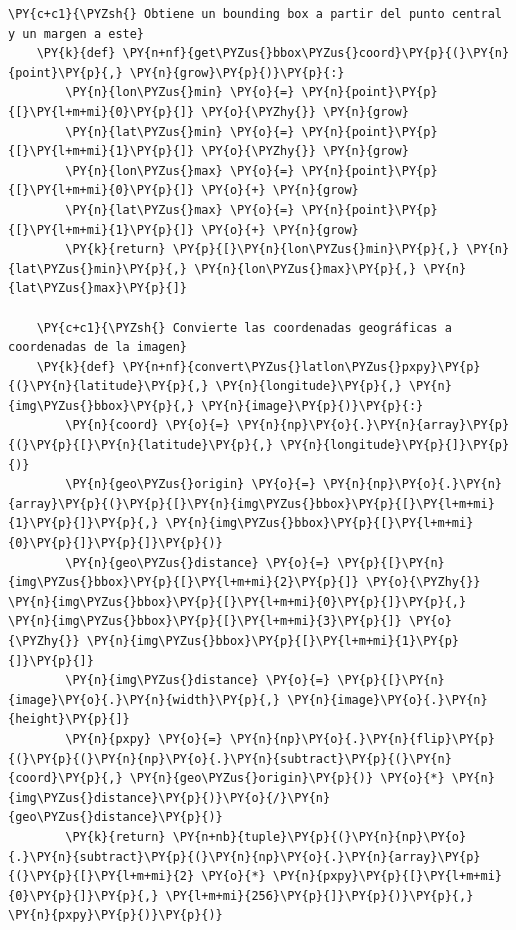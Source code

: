 \begin{tcolorbox}[breakable, size=fbox, boxrule=1pt, pad at break*=1mm,colback=cellbackground, colframe=cellborder, fontupper=\footnotesize]
    \begin{Verbatim}[commandchars=\\\{\}]
    \PY{c+c1}{\PYZsh{} Obtiene un bounding box a partir del punto central y un margen a este}
    \PY{k}{def} \PY{n+nf}{get\PYZus{}bbox\PYZus{}coord}\PY{p}{(}\PY{n}{point}\PY{p}{,} \PY{n}{grow}\PY{p}{)}\PY{p}{:}
        \PY{n}{lon\PYZus{}min} \PY{o}{=} \PY{n}{point}\PY{p}{[}\PY{l+m+mi}{0}\PY{p}{]} \PY{o}{\PYZhy{}} \PY{n}{grow}
        \PY{n}{lat\PYZus{}min} \PY{o}{=} \PY{n}{point}\PY{p}{[}\PY{l+m+mi}{1}\PY{p}{]} \PY{o}{\PYZhy{}} \PY{n}{grow}
        \PY{n}{lon\PYZus{}max} \PY{o}{=} \PY{n}{point}\PY{p}{[}\PY{l+m+mi}{0}\PY{p}{]} \PY{o}{+} \PY{n}{grow}
        \PY{n}{lat\PYZus{}max} \PY{o}{=} \PY{n}{point}\PY{p}{[}\PY{l+m+mi}{1}\PY{p}{]} \PY{o}{+} \PY{n}{grow}
        \PY{k}{return} \PY{p}{[}\PY{n}{lon\PYZus{}min}\PY{p}{,} \PY{n}{lat\PYZus{}min}\PY{p}{,} \PY{n}{lon\PYZus{}max}\PY{p}{,} \PY{n}{lat\PYZus{}max}\PY{p}{]}
    
    \PY{c+c1}{\PYZsh{} Convierte las coordenadas geográficas a coordenadas de la imagen}
    \PY{k}{def} \PY{n+nf}{convert\PYZus{}latlon\PYZus{}pxpy}\PY{p}{(}\PY{n}{latitude}\PY{p}{,} \PY{n}{longitude}\PY{p}{,} \PY{n}{img\PYZus{}bbox}\PY{p}{,} \PY{n}{image}\PY{p}{)}\PY{p}{:}       
        \PY{n}{coord} \PY{o}{=} \PY{n}{np}\PY{o}{.}\PY{n}{array}\PY{p}{(}\PY{p}{[}\PY{n}{latitude}\PY{p}{,} \PY{n}{longitude}\PY{p}{]}\PY{p}{)}   
        \PY{n}{geo\PYZus{}origin} \PY{o}{=} \PY{n}{np}\PY{o}{.}\PY{n}{array}\PY{p}{(}\PY{p}{[}\PY{n}{img\PYZus{}bbox}\PY{p}{[}\PY{l+m+mi}{1}\PY{p}{]}\PY{p}{,} \PY{n}{img\PYZus{}bbox}\PY{p}{[}\PY{l+m+mi}{0}\PY{p}{]}\PY{p}{]}\PY{p}{)}    
        \PY{n}{geo\PYZus{}distance} \PY{o}{=} \PY{p}{[}\PY{n}{img\PYZus{}bbox}\PY{p}{[}\PY{l+m+mi}{2}\PY{p}{]} \PY{o}{\PYZhy{}} \PY{n}{img\PYZus{}bbox}\PY{p}{[}\PY{l+m+mi}{0}\PY{p}{]}\PY{p}{,} \PY{n}{img\PYZus{}bbox}\PY{p}{[}\PY{l+m+mi}{3}\PY{p}{]} \PY{o}{\PYZhy{}} \PY{n}{img\PYZus{}bbox}\PY{p}{[}\PY{l+m+mi}{1}\PY{p}{]}\PY{p}{]}
        \PY{n}{img\PYZus{}distance} \PY{o}{=} \PY{p}{[}\PY{n}{image}\PY{o}{.}\PY{n}{width}\PY{p}{,} \PY{n}{image}\PY{o}{.}\PY{n}{height}\PY{p}{]}
        \PY{n}{pxpy} \PY{o}{=} \PY{n}{np}\PY{o}{.}\PY{n}{flip}\PY{p}{(}\PY{p}{(}\PY{n}{np}\PY{o}{.}\PY{n}{subtract}\PY{p}{(}\PY{n}{coord}\PY{p}{,} \PY{n}{geo\PYZus{}origin}\PY{p}{)} \PY{o}{*} \PY{n}{img\PYZus{}distance}\PY{p}{)}\PY{o}{/}\PY{n}{geo\PYZus{}distance}\PY{p}{)}
        \PY{k}{return} \PY{n+nb}{tuple}\PY{p}{(}\PY{n}{np}\PY{o}{.}\PY{n}{subtract}\PY{p}{(}\PY{n}{np}\PY{o}{.}\PY{n}{array}\PY{p}{(}\PY{p}{[}\PY{l+m+mi}{2} \PY{o}{*} \PY{n}{pxpy}\PY{p}{[}\PY{l+m+mi}{0}\PY{p}{]}\PY{p}{,} \PY{l+m+mi}{256}\PY{p}{]}\PY{p}{)}\PY{p}{,} \PY{n}{pxpy}\PY{p}{)}\PY{p}{)}
    \end{Verbatim}
\end{tcolorbox}
    
